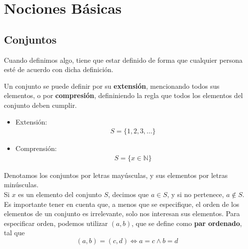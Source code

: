 \documentclass{../Topologia.tex}
\begin{document}
\chapter{Nociones Básicas}
\section{Conjuntos}
Cuando definimos algo, tiene que estar definido de forma que cualquier persona
esté de acuerdo con dicha definición.
\begin{defin}
	Un conjunto se puede definir por su \textbf{extensión}, mencionando todos
	sus elementos, o por \textbf{compresión}, defininiendo la regla que todos
	los elementos del conjunto deben cumplir.
	\begin{itemize}
		\item Extensión:\\
			\begin{equation}
				\begin{split}
					S = \{ 1,2,3,\dots  \}
				\end{split}
			\end{equation}
		\item Comprensión:\\
			\begin{equation}
				\begin{split}
					S = \{ x \in \mathbb{N} \}
				\end{split}
			\end{equation}
	\end{itemize}
	Denotamos los conjuntos por letras mayúsculas, y sus elementos por letras
	minúsculas.\\
	Si $x$ es un elemento del conjunto $S$, decimos que $a \in S$, y si no
	pertenece, $a \notin S$. Es importante tener en cuenta que, a menos que se
	especifique, el orden de los elementos de un conjunto es irrelevante, solo nos
	interesan sus elementos. Para especificar orden, podemos utilizar $(a,b)$,
	que se define como \textbf{par ordenado}, tal que
	\[
		(a,b) = (c,d) \iff a=c \wedge b = d
	\]
\end{defin}
\end{document}
